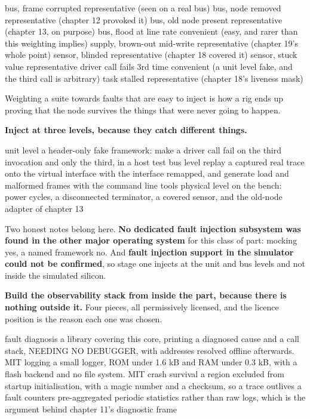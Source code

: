 \begin{steps}
\begin{plaincode}
  bus, frame corrupted        representative  (seen on a real bus)
  bus, node removed           representative  (chapter 12 provoked it)
  bus, old node present       representative  (chapter 13, on purpose)
  bus, flood at line rate     convenient      (easy, and rarer than this
                                               weighting implies)
  supply, brown-out mid-write representative  (chapter 19's whole point)
  sensor, blinded             representative  (chapter 18 covered it)
  sensor, stuck value         representative
  driver call fails 3rd time  convenient      (a unit level fake, and the
                                               third call is arbitrary)
  task stalled                representative  (chapter 18's liveness mask)
\end{plaincode}
Weighting a suite towards faults that are easy to inject is how a rig ends up
proving that the node survives the things that were never going to happen.

\item \textbf{Inject at three levels, because they catch different things.}
\begin{plaincode}
unit level     a header-only fake framework: make a driver call fail on the
               third invocation and only the third, in a host test
bus level      replay a captured real trace onto the virtual interface with
               the interface remapped, and generate load and malformed
               frames with the command line tools
physical level on the bench: power cycles, a disconnected terminator, a
               covered sensor, and the old-node adapter of chapter 13
\end{plaincode}
Two honest notes belong here. \textbf{No dedicated fault injection subsystem was
found in the other major operating system} for this class of part: mocking yes,
a named framework no. And \textbf{fault injection support in the simulator could
not be confirmed}, so stage one injects at the unit and bus levels and not
inside the simulated silicon.

\item \textbf{Build the observability stack from inside the part, because there
is nothing outside it.} Four pieces, all permissively licensed, and the licence
position is the reason each one was chosen.
\begin{plaincode}
fault diagnosis  a library covering this core, printing a diagnosed cause
                 and a call stack, NEEDING NO DEBUGGER, with addresses
                 resolved offline afterwards. MIT
logging          a small logger, ROM under 1.6 kB and RAM under 0.3 kB,
                 with a flash backend and no file system. MIT
crash survival   a region excluded from startup initialisation, with a
                 magic number and a checksum, so a trace outlives a fault
counters         pre-aggregated periodic statistics rather than raw logs,
                 which is the argument behind chapter 11's diagnostic frame
\end{plaincode}


\end{steps}
